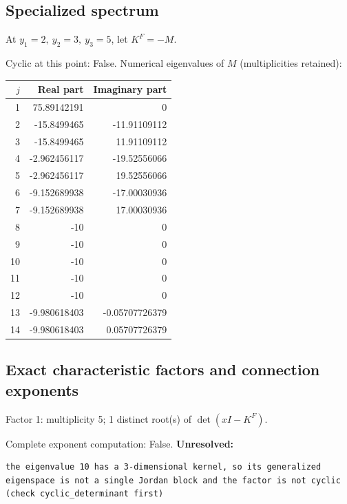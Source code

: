 \documentclass[10pt,a4paper]{article}
\newcommand{\fitmath}[1]{\sbox{\mathbox}{$\displaystyle #1$}\ifdim\wd\mathbox>\linewidth\resizebox{\linewidth}{!}{\usebox{\mathbox}}\else\usebox{\mathbox}\fi}
\begin{document}
\subsection*{Specialized spectrum}
At $y_1=2,\ y_2=3,\ y_3=5$, let $K^F=-M$.
\begin{center}\fitmath{\Delta=0}\end{center}
Cyclic at this point: False.
Numerical eigenvalues of $M$ (multiplicities retained):
\begin{center}\small\begin{tabular}{rrr}\toprule $j$ & Real part & Imaginary part\\\midrule
1 & 75.89142191 & 0\\
2 & -15.8499465 & -11.91109112\\
3 & -15.8499465 & 11.91109112\\
4 & -2.962456117 & -19.52556066\\
5 & -2.962456117 & 19.52556066\\
6 & -9.152689938 & -17.00030936\\
7 & -9.152689938 & 17.00030936\\
8 & -10 & 0\\
9 & -10 & 0\\
10 & -10 & 0\\
11 & -10 & 0\\
12 & -10 & 0\\
13 & -9.980618403 & -0.05707726379\\
14 & -9.980618403 & 0.05707726379\\
\bottomrule\end{tabular}\end{center}
\subsection*{Exact characteristic factors and connection exponents}
Factor 1: multiplicity 5; 1 distinct root(s) of $\det(xI-K^F)$.
\begin{center}\fitmath{\begin{aligned}p_{1}(x)&=x - 10\end{aligned}}\end{center}
Complete exponent computation: False.
\textbf{Unresolved:}

\begin{lstlisting}
the eigenvalue 10 has a 3-dimensional kernel, so its generalized eigenspace is not a single Jordan block and the factor is not cyclic (check cyclic_determinant first)
\end{lstlisting}
\end{document}
